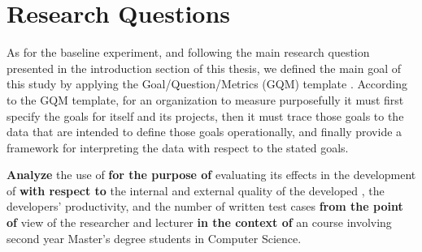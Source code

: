 \section{Research Questions}
As for the baseline experiment, and following the main research question presented in the introduction section of this thesis, we defined the main goal of this study by applying the Goal/Question/Metrics (GQM) template \cite{GQM}.
According to the GQM template, for an organization to measure purposefully it must first specify the goals for itself and its projects, then it must trace those goals to the data that are intended to define those goals operationally, and finally provide a framework for interpreting the data with respect to the stated goals.
\begin{framed}
\noindent
\textbf{Analyze} the use of \tdd 
\textbf{for the purpose of} evaluating its effects in the development of \ess
\textbf{with respect to} the internal and external quality of the developed \ess, the developers' productivity, and the number of written test cases
\textbf{from the point of} view of the researcher and lecturer 
\textbf{in the context of} an \es course involving second year Master's degree students in Computer Science.
\end{framed}

